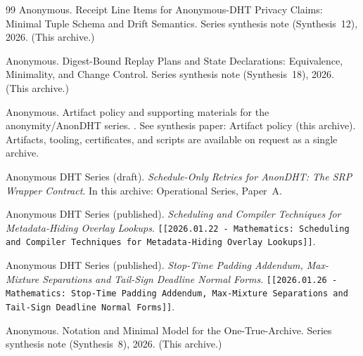\documentclass[11pt]{article}
\begin{document}
\begin{thebibliography}{99}
Anonymous.
\newblock Receipt Line Items for Anonymous-DHT Privacy Claims: Minimal Tuple Schema and Drift Semantics.
\newblock Series synthesis note (Synthesis~12), 2026. (This archive.)

Anonymous.
\newblock Digest-Bound Replay Plans and State Declarations: Equivalence, Minimality, and Change Control.
\newblock Series synthesis note (Synthesis~18), 2026. (This archive.)

Anonymous.
\newblock Artifact policy and supporting materials for the anonymity/AnonDHT series.
.
\newblock See synthesis paper: Artifact policy (this archive). Artifacts, tooling, certificates, and scripts are available on request as a single archive.



Anonymous DHT Series (draft).
\emph{Schedule-Only Retries for AnonDHT: The SRP Wrapper Contract}.
In this archive: Operational Series, Paper~A.

Anonymous DHT Series (published).
\emph{Scheduling and Compiler Techniques for Metadata-Hiding Overlay Lookups}.
\texttt{[[2026.01.22 - Mathematics: Scheduling and Compiler Techniques for Metadata-Hiding Overlay Lookups]]}.

Anonymous DHT Series (published).
\emph{Stop-Time Padding Addendum, Max-Mixture Separations and Tail-Sign Deadline Normal Forms}.
\texttt{[[2026.01.26 - Mathematics: Stop-Time Padding Addendum, Max-Mixture Separations and Tail-Sign Deadline Normal Forms]]}.


Anonymous.
\newblock Notation and Minimal Model for the One-True-Archive.
\newblock Series synthesis note (Synthesis~8), 2026. (This archive.)

\end{thebibliography}
\end{document}
